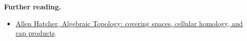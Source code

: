 \documentclass[preprint,12pt,aps,pra,showkeys,amsmath,amssymb,superscriptaddress,floatfix]{revtex4-2}
\theoremstyle{definition}
\theoremstyle{remark}
\providecommand{\tightlist}{\setlength{\itemsep}{2pt}\setlength{\parskip}{0pt}}
\begin{document}
\par\smallskip\begingroup\small\linespread{1.0}\selectfont\noindent\textbf{Further reading.} \begin{itemize}
\tightlist
\item
  \href{https://pi.math.cornell.edu/~hatcher/AT/AT.pdf}{Allen Hatcher,
  Algebraic Topology: covering spaces, cellular homology, and cap
  products}.
\end{itemize}\par\endgroup
\end{document}
